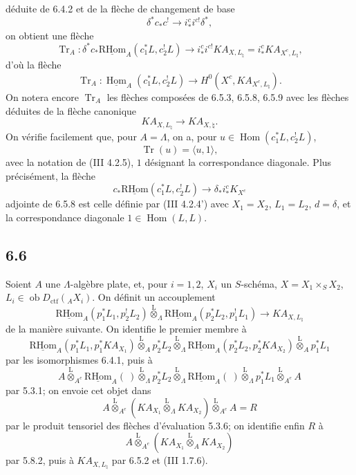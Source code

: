 \documentclass[11pt]{article}
\DeclareMathOperator{\Hom}{Hom}
\providecommand{\RHom}{\mathrm{RHom}}
\providecommand{\uRHom}{\underline{\RHom}}
\providecommand{\uHom}{\underline{\Hom}}
\providecommand{\Tr}{\operatorname{Tr}}
\providecommand{\Tr}{\operatorname{Tr}}
\providecommand{\lten}{\overset{\mathrm L}{\otimes}}
\providecommand{\Ob}{\operatorname{ob}}
\providecommand{\Tr}{\operatorname{Tr}}
\providecommand{\RHom}{\mathrm{RHom}}
\providecommand{\Hom}{\operatorname{Hom}}
\providecommand{\lten}{\overset{\mathrm L}{\otimes}}
\providecommand{\RHom}{\mathrm R\mathcal{H}om}
\providecommand{\lten}{\overset{\mathrm L}{\otimes}}
\providecommand{\Ob}{\operatorname{ob}}
\providecommand{\Tr}{\operatorname{Tr}}
\providecommand{\lten}{\overset{\mathrm L}{\otimes}}
\providecommand{\lten}{\overset{\mathrm L}{\otimes}}
\providecommand{\Ob}{\operatorname{Ob}}
\providecommand{\lten}{\overset{\mathrm L}{\otimes}}
\providecommand{\RHom}{\mathrm{RHom}}
\providecommand{\Hom}{\operatorname{Hom}}
\providecommand{\Tr}{\operatorname{Tr}}
\providecommand{\Ob}{\operatorname{ob}}
\providecommand{\Ob}{\operatorname{Ob}}
\providecommand{\lten}{\overset{\mathrm L}{\otimes}}
\begin{document}
déduite de 6.4.2 et de la flèche de changement de base
\[
\delta^*c_*c^!\longrightarrow i_*^ci^{c!}\delta^*,
\]
on obtient une flèche
\begin{equation}
\Tr_A:\delta^*c_*\uRHom_A(c_1^*L,c_2^!L)
\longrightarrow
i_*^ci^{c!}KA_{X,L_{\natural}}
=i_*^cKA_{X^c,L_{\natural}},
\tag{6.5.8}
\end{equation}
d'où la flèche
\begin{equation}
\Tr_A:\uHom_A(c_1^*L,c_2^!L)
\longrightarrow
H^0(X^c,KA_{X^c,L_{\natural}}).
\tag{6.5.9}
\end{equation}
On notera encore $\Tr_A$ les flèches composées de 6.5.3, 6.5.8, 6.5.9 avec les flèches déduites de la flèche canonique
\[
KA_{X,L_{\natural}}\longrightarrow KA_{X,\natural}.
\]
On vérifie facilement que, pour $A=\Lambda$, on a, pour $u\in\Hom(c_1^*L,c_2^!L)$,
\begin{equation}
\Tr(u)=\langle u,1\rangle,
\tag{6.5.10}
\end{equation}
avec la notation de (III 4.2.5), $1$ désignant la correspondance diagonale. Plus précisément, la flèche
\[
c_*\uRHom(c_1^*L,c_2^!L)\longrightarrow \delta_*i_*^cK_{X^c}
\]
adjointe de 6.5.8 est celle définie par (III 4.2.4') avec $X_1=X_2$, $L_1=L_2$, $d=\delta$, et la correspondance diagonale $1\in\Hom(L,L)$.

\subsection*{6.6}
Soient $A$ une $\Lambda$-algèbre plate, et, pour $i=1,2$, $X_i$ un $S$-schéma, $X=X_1\times_SX_2$, $L_i\in\Ob D_{\mathrm{ctf}}({}_AX_i)$. On définit un accouplement
\begin{equation}
\uRHom_A(p_1^*L_1,p_2^!L_2)
\lten_{\Lambda}
\uRHom_A(p_2^*L_2,p_1^!L_1)
\longrightarrow
KA_{X,L_{\natural}}
\tag{6.6.1}
\end{equation}
de la manière suivante. On identifie le premier membre à
\[
\uRHom_A(p_1^*L_1,p_1^*KA_{X_1})
\lten_A p_2^*L_2
\lten_{\Lambda}
\uRHom_A(p_2^*L_2,p_2^*KA_{X_2})
\lten_A p_1^*L_1
\]
par les isomorphismes 6.4.1, puis à
\[
A\lten_{A^e}\uRHom_A(\ )\lten_{\Lambda}p_2^*L_2
 \lten_{\Lambda}\uRHom_A(\ )\lten_{\Lambda}p_1^*L_1\lten_{A^e}A
\]
par 5.3.1; on envoie cet objet dans
\[
A\lten_{A^e}(KA_{X_1}\lten_{\Lambda}KA_{X_2})\lten_{A^e}A=R
\]
par le produit tensoriel des flèches d'évaluation 5.3.6; on identifie enfin $R$ à
\[
A\lten_{A^e}(KA_{X_1}\lten_A KA_{X_2})
\]
par 5.8.2, puis à $KA_{X,L_{\natural}}$ par 6.5.2 et (III 1.7.6).
\end{document}
